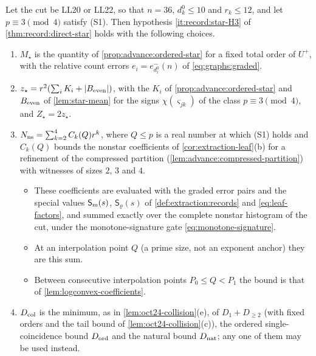 \begin{lemma}\label{lem:record:direct-star-inputs}
Let the cut be LL20 or LL22, so that $n=36$, $d^0_k\le10$ and $r_k\le12$, and let
$p\equiv3\pmod4$ satisfy (S1). Then hypothesis \ref{it:record:star-H3} of
\cref{thm:record:direct-star} holds with the following choices.
\begin{enumerate}[label=(\roman*)]
\item $M_\star$ is the quantity of \cref{prop:advance:ordered-star} for a fixed
 total order of $U^+$, with the relative count errors $e_i=e^-_{d^0_i}(n)$ of
 \eqref{eq:graphs:graded}.
\item $z_\star=r^2(\sum_iK_i+|B_{\rm even}|)$, with the $K_i$ of
 \cref{prop:advance:ordered-star} and $B_{\rm even}$ of \cref{lem:star-mean}
 for the signs $\chi(\varsigma_{jk})$ of the class $p\equiv3\pmod4$, and
 $Z_\star=2z_\star$.
\item $N_{\rm ns}=\sum_{k=2}^4C_k(Q)r^k$, where $Q\le p$ is a real number at which
 (S1) holds and $C_k(Q)$ bounds the nonstar coefficients of
 \cref{cor:extraction-leaf}(b) for a refinement of the compressed partition
 (\cref{lem:advance:compressed-partition}) with witnesses of sizes $2$, $3$ and $4$.
 \begin{itemize}
 \item These coefficients are evaluated with the graded error pairs and the
  special values $\mathsf S_{\rm m}(s)$, $\mathsf S_\varrho(s)$ of
  \cref{def:extraction:records} and \eqref{eq:leaf-factors}, and summed exactly
  over the complete nonstar histogram of the cut, under the monotone-signature gate
  \eqref{eq:monotone-signature}.
 \item At an interpolation point $Q$ (a prime size, not an exponent anchor) they are this sum.
 \item Between consecutive interpolation points $P_0\le Q<P_1$ the bound is that of
  \cref{lem:logconvex-coefficients}.
 \end{itemize}
\item $D_{\rm col}$ is the minimum, as in \cref{lem:oct24-collision}(e), of
 $D_1+D_{\ge2}$ (with fixed orders and the tail bound of
 \cref{lem:oct24-collision}(c)), the ordered single-coincidence bound
 $D_{\rm ord}$ and the natural bound $D_{\rm nat}$; any one of them may be used
 instead.
\end{enumerate}
\end{lemma}


